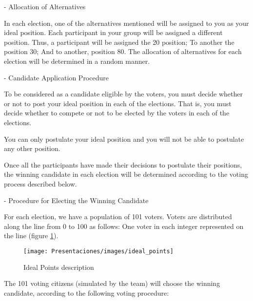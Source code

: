 	- Allocation of Alternatives
	
	In each election, one of the alternatives mentioned will be assigned to you as your ideal position. Each participant in your group will be assigned a different position. Thus, a participant will be assigned the 20 position; To another the position 30; And to another, position 80. The allocation of alternatives for each election will be determined in a random manner.
	
	- Candidate Application Procedure
	
	To be considered as a candidate eligible by the voters, you must decide whether or not to post your ideal position in each of the elections. That is, you must decide whether to compete or not to be elected by the voters in each of the elections.
	
	You can only postulate your ideal position and you will not be able to postulate any other position.
	
	Once all the participants have made their decisions to postulate their positions, the winning candidate in each election will be determined according to the voting process described below.
	
	- Procedure for Electing the Winning Candidate
	
	For each election, we have a population of 101 voters. Voters are distributed along the line from 0 to 100 as follows: One voter in each integer represented on the line (figure \ref{fig:ideal_points2}).
	
\begin{figure}[h]
	\centering
	\texttt{[image: Presentaciones/images/ideal\_points]}
	\caption[Ideal Points]{Ideal Points description}
	\label{fig:ideal_points2}
\end{figure} 

	The 101 voting citizens (simulated by the team) will choose the winning candidate, according to the following voting procedure:

